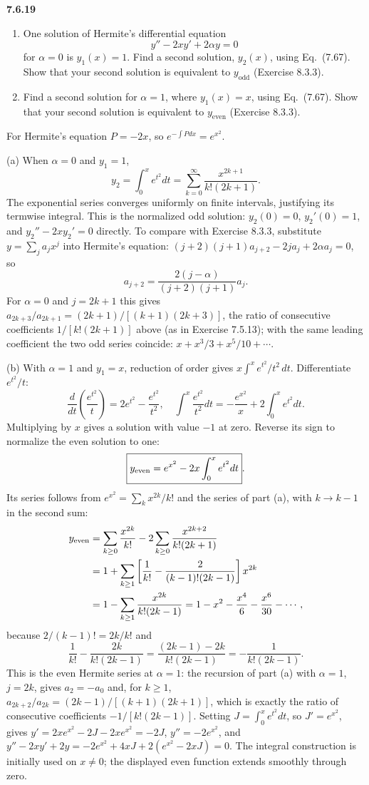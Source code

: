 \par\bigskip
\noindent\textbf{7.6.19}\quad
\begin{enumerate}
\item[(a)] One solution of Hermite's differential equation
  \[
  y''-2xy'+2\alpha y=0
  \]
  for $\alpha=0$ is $y_{1}(x)=1$. Find a second solution, $y_{2}(x)$, using
  Eq.~(7.67). Show that your second solution is equivalent to
  $y_{\mathrm{odd}}$ (Exercise 8.3.3).
\item[(b)] Find a second solution for $\alpha=1$, where $y_{1}(x)=x$, using
  Eq.~(7.67). Show that your second solution is equivalent to
  $y_{\mathrm{even}}$ (Exercise 8.3.3).
\end{enumerate}
\solution
For Hermite's equation $P=-2x$, so $e^{-\int Pdx}=e^{x^2}$.

(a) When $\alpha=0$ and $y_1=1$,
\[
\boxed{y_2=\int_0^xe^{t^2}dt
=\sum_{k=0}^\infty\frac{x^{2k+1}}{k!(2k+1)}}.
\]
The exponential series converges uniformly on finite intervals,
justifying its termwise integral. This is the normalized odd solution:
$y_2(0)=0$, $y_2'(0)=1$, and $y_2''-2xy_2'=0$ directly. To compare
with Exercise 8.3.3, substitute $y=\sum_ja_jx^j$ into Hermite's
equation: $(j+2)(j+1)a_{j+2}-2ja_j+2\alpha a_j=0$, so
\[
a_{j+2}=\frac{2(j-\alpha)}{(j+2)(j+1)}a_j.
\]
For $\alpha=0$ and $j=2k+1$ this gives
$a_{2k+3}/a_{2k+1}=(2k+1)/[(k+1)(2k+3)]$, the ratio of consecutive
coefficients $1/[k!(2k+1)]$ above (as in Exercise 7.5.13); with the
same leading coefficient the two odd series coincide:
$x+x^3/3+x^5/10+\cdots$.

(b) With $\alpha=1$ and $y_1=x$, reduction of order gives
$x\int^xe^{t^2}/t^2\,dt$. Differentiate $e^{t^2}/t$:
\[
\frac d{dt}\left(\frac{e^{t^2}}t\right)
=2e^{t^2}-\frac{e^{t^2}}{t^2},
\quad
\int^x\frac{e^{t^2}}{t^2}dt=-\frac{e^{x^2}}x+2\int_0^xe^{t^2}dt.
\]
Multiplying by $x$ gives a solution with value $-1$ at zero. Reverse
its sign to normalize the even solution to one:
\[
\boxed{y_{\rm even}=e^{x^2}-2x\int_0^xe^{t^2}dt}.
\]
Its series follows from $e^{x^2}=\sum_kx^{2k}/k!$ and the series of
part (a), with $k\to k-1$ in the second sum:
\begin{align*}
y_{\rm even}
&=\sum_{k\ge0}\frac{x^{2k}}{k!}
 -2\sum_{k\ge0}\frac{x^{2k+2}}{k!(2k+1)}\\
&=1+\sum_{k\ge1}\left[\frac1{k!}
 -\frac2{(k-1)!(2k-1)}\right]x^{2k}\\
&=1-\sum_{k\ge1}\frac{x^{2k}}{k!(2k-1)}
=1-x^2-\frac{x^4}{6}-\frac{x^6}{30}-\cdots,
\end{align*}
because $2/(k-1)!=2k/k!$ and
\[
\frac1{k!}-\frac{2k}{k!(2k-1)}=\frac{(2k-1)-2k}{k!(2k-1)}
=-\frac1{k!(2k-1)}.
\]
This is the even Hermite series at $\alpha=1$: the recursion of part (a)
with $\alpha=1$, $j=2k$, gives $a_2=-a_0$ and, for $k\ge1$,
$a_{2k+2}/a_{2k}=(2k-1)/[(k+1)(2k+1)]$, which is exactly the ratio of
consecutive coefficients $-1/[k!(2k-1)]$. Setting
$J=\int_0^xe^{t^2}dt$, so $J'=e^{x^2}$, gives
$y'=2xe^{x^2}-2J-2xe^{x^2}=-2J$, $y''=-2e^{x^2}$, and
$y''-2xy'+2y=-2e^{x^2}+4xJ+2(e^{x^2}-2xJ)=0$.
The integral construction is initially used on $x\ne0$; the displayed
even function extends smoothly through zero.

